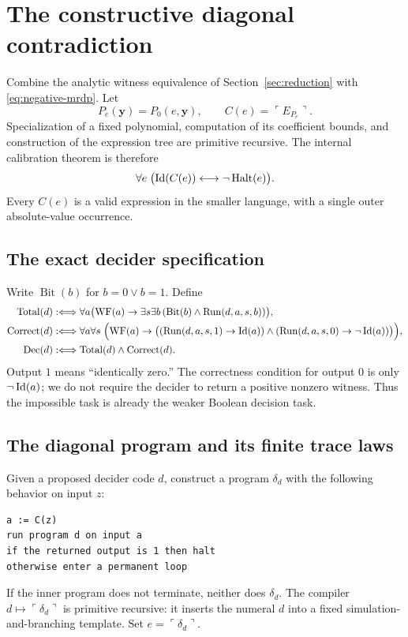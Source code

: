 \section{The constructive diagonal contradiction}
\label{sec:diagonal}

Combine the analytic witness equivalence of Section~\ref{sec:reduction}
with \eqref{eq:negative-mrdp}. Let
\[
 P_e(\boldsymbol y)=P_0(e,\boldsymbol y),\qquad C(e)=\ulcorner E_{P_e}\urcorner.
\]
Specialization of a fixed polynomial, computation of its coefficient
bounds, and construction of the expression tree are primitive recursive.
The internal calibration theorem is therefore
\begin{equation}\label{eq:calibration}
 \forall e\;\bigl(\operatorname{Id}(C(e))\longleftrightarrow\neg\operatorname{Halt}(e)\bigr).
\end{equation}
Every $C(e)$ is a valid expression in the smaller language, with a single
outer absolute-value occurrence.

\subsection{The exact decider specification}

Write $\operatorname{Bit}(b)$ for $b=0\lor b=1$. Define
\begin{align*}
 \operatorname{Total}(d)&:\Longleftrightarrow
  \forall a\bigl(\operatorname{WF}(a)\to
      \exists s\exists b\,(
          \operatorname{Bit}(b)\land\operatorname{Run}(d,a,s,b))\bigr),\\
 \operatorname{Correct}(d)&:\Longleftrightarrow
  \forall a\forall s\;\Bigl(\operatorname{WF}(a)\to
       \bigl((\operatorname{Run}(d,a,s,1)\to\operatorname{Id}(a))\land
             (\operatorname{Run}(d,a,s,0)\to\neg\operatorname{Id}(a))\bigr)\Bigr),\\
 \operatorname{Dec}(d)&:\Longleftrightarrow
       \operatorname{Total}(d)\land\operatorname{Correct}(d).
\end{align*}
Output $1$ means ``identically zero.'' The correctness condition for
output $0$ is only $\neg\operatorname{Id}(a)$; we do not require the decider to return a
positive nonzero witness. Thus the impossible task is already the weaker
Boolean decision task.

\subsection{The diagonal program and its finite trace laws}

Given a proposed decider code $d$, construct a program $\delta_d$ with the
following behavior on input $z$:
\begin{lstlisting}
a := C(z)
run program d on input a
if the returned output is 1 then halt
otherwise enter a permanent loop
\end{lstlisting}
If the inner program does not terminate, neither does $\delta_d$. The
compiler $d\mapsto\ulcorner\delta_d\urcorner$ is primitive recursive:
it inserts the numeral $d$ into a fixed simulation-and-branching template.
Set $e=\ulcorner\delta_d\urcorner$.

